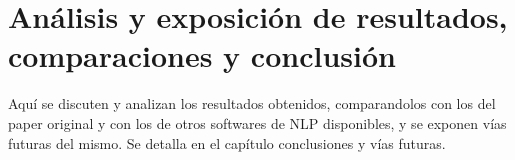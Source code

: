 \section{Análisis y exposición de resultados, comparaciones y conclusión}   
Aquí se discuten y analizan los resultados obtenidos, comparandolos con los del paper original y con los de otros softwares de NLP disponibles, y se exponen vías futuras del mismo. Se detalla en el capítulo conclusiones y vías futuras.


